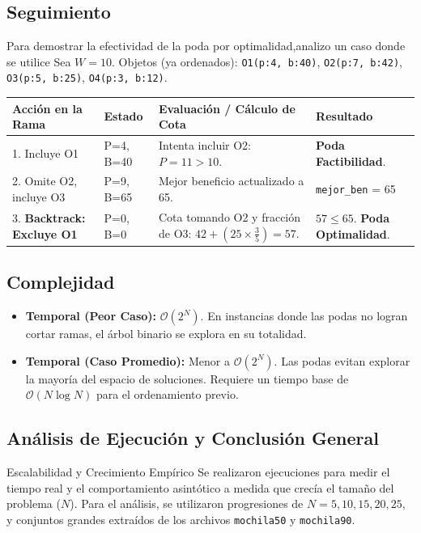 \documentclass[11pt,a4paper]{article}
\begin{document}
\subsection{Seguimiento}
Para demostrar la efectividad de la poda por optimalidad,analizo un caso donde se utilice
Sea $W = 10$. Objetos (ya ordenados): \texttt{O1(p:4, b:40)}, \texttt{O2(p:7, b:42)}, \texttt{O3(p:5, b:25)}, \texttt{O4(p:3, b:12)}.
\begin{center}
    \begin{tabular}{@{}p{3.5cm}p{2cm}p{5.5cm}p{3cm}@{}}
        \toprule
        \textbf{Acción en la Rama} & \textbf{Estado} & \textbf{Evaluación / Cálculo de Cota} & \textbf{Resultado} \\ \midrule
        1. Incluye O1 & P=4, B=40 & Intenta incluir O2: $P=11>10$. & \textbf{Poda Factibilidad}. \\
        2. Omite O2, incluye O3 & P=9, B=65 & Mejor beneficio actualizado a 65. & \texttt{mejor\_ben} = 65 \\
        3. \textbf{Backtrack: Excluye O1} & P=0, B=0 & Cota tomando O2 y fracción de O3: $42 + (25 \times \frac{3}{5}) = 57$. & $57 \le 65$. \textbf{Poda Optimalidad}. \\ \bottomrule
        \bottomrule
    \end{tabular}
\end{center}





\subsection{Complejidad}
\begin{itemize}
    \item \textbf{Temporal (Peor Caso):} $\mathcal{O}(2^N)$. En instancias donde las podas no logran cortar ramas, el árbol binario se explora en su totalidad.
    \item \textbf{Temporal (Caso Promedio):} Menor a $\mathcal{O}(2^N)$. Las podas evitan explorar la mayoría del espacio de soluciones. Requiere un tiempo base de $\mathcal{O}(N \log N)$ para el ordenamiento previo.
\end{itemize}

\subsection{Análisis de Ejecución y Conclusión General}

{Escalabilidad y Crecimiento Empírico}
Se realizaron ejecuciones para medir el tiempo real y el comportamiento asintótico a medida que crecía el tamaño del problema ($N$). Para el análisis, se utilizaron progresiones de $N=5, 10, 15, 20, 25$, y conjuntos grandes extraídos de los archivos \texttt{mochila50} y \texttt{mochila90}.
\end{document}
